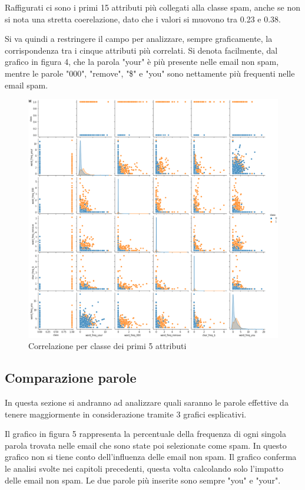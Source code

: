 \documentclass[12pt,a4paper]{article}
\begin{document}
Raffigurati ci sono i primi 15 attributi più collegati alla classe spam, anche se non si nota una stretta coerelazione, dato che i valori si muovono tra 0.23 e 0.38.

Si va quindi a restringere il campo per analizzare, sempre graficamente, la corrispondenza tra i cinque attributi più correlati. Si denota facilmente, dal grafico in figura 4, che la parola "your" è più presente nelle email non spam, mentre le parole "000", "remove", "\$" e "you" sono nettamente più frequenti nelle email spam.

\begin{figure}[H]
    \includegraphics[width=1\columnwidth]{correlation_pair_top_6.png}
    \caption{Correlazione per classe dei primi 5 attributi}
\end{figure}
\clearpage
\subsection{Comparazione parole}
In questa sezione si andranno ad analizzare quali saranno le parole effettive da tenere maggiormente in considerazione tramite 3 grafici esplicativi.


Il grafico in figura 5 rappresenta la percentuale della frequenza di ogni singola parola trovata nelle email che sono state poi selezionate come spam. In questo grafico non si tiene conto dell'influenza delle email non spam. Il grafico conferma le analisi svolte nei capitoli precedenti, questa volta calcolando solo l'impatto delle email non spam. Le due parole più inserite sono sempre "you" e "your".
\end{document}
